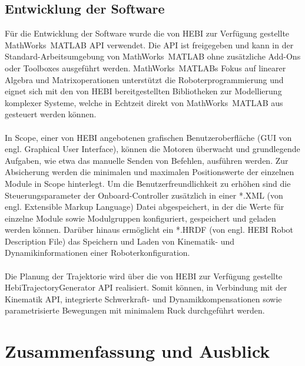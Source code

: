 \documentclass[Bachelor, BMR, ngerman]{twbook}
\begin{document}
    \section{Entwicklung der Software}
    
    Für die Entwicklung der Software wurde die von HEBI zur Verfügung gestellte MathWorks\textregistered\ MATLAB API verwendet. Die API ist freigegeben und kann in der Standard-Arbeitsumgebung von MathWorks\textregistered\ MATLAB ohne zusätzliche Add-Ons oder Toolboxes ausgeführt werden. MathWorks\textregistered\ MATLABs Fokus auf linearer Algebra und Matrixoperationen unterstützt die Roboterprogrammierung und eignet sich mit den von HEBI bereitgestellten Bibliotheken zur Modellierung komplexer Systeme, welche in Echtzeit direkt von MathWorks\textregistered\ MATLAB aus gesteuert werden können.\\
    \\
    In Scope, einer von HEBI angebotenen grafischen Benutzeroberfläche (GUI von engl. Graphical User Interface), können die Motoren überwacht und grundlegende Aufgaben, wie etwa das manuelle Senden von Befehlen, ausführen werden. Zur Absicherung werden die minimalen und maximalen Positionswerte der einzelnen Module in Scope hinterlegt. Um die Benutzerfreundlichkeit zu erhöhen sind die Steuerungsparameter der Onboard-Controller zusätzlich in einer *.XML (von engl. Extensible Markup Language) Datei abgespeichert, in der die Werte für einzelne Module sowie Modulgruppen konfiguriert, gespeichert und geladen werden können. Darüber hinaus ermöglicht ein *.HRDF (von engl. HEBI Robot Description File) das Speichern und Laden von Kinematik- und Dynamikinformationen einer Roboterkonfiguration.\\
    \\
    Die Planung der Trajektorie wird über die von HEBI zur Verfügung gestellte HebiTrajectoryGenerator API realisiert. Somit können, in Verbindung mit der Kinematik API, integrierte Schwerkraft- und Dynamikkompensationen sowie parametrisierte Bewegungen mit minimalem Ruck durchgeführt werden.

\chapter{Zusammenfassung und Ausblick}
\label{cap:zusammenfassung-und-ausblick}
\end{document}

